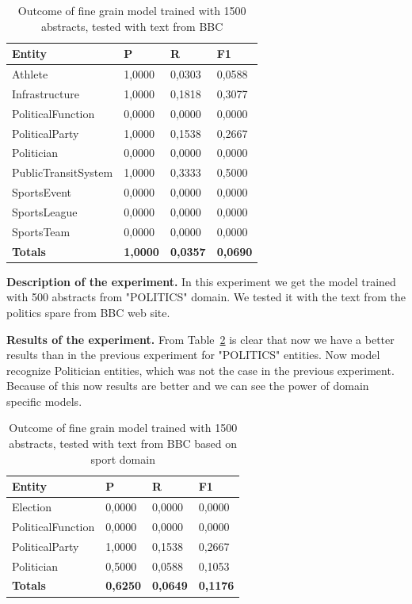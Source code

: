 \documentclass[thesis=M,english]{FITthesis}[2018/05/30]
\begin{document}
\begin{table}[H]\centering
	\begin{tabular}{|l|l|l|l|}
		\hline {\textbf{Entity}} & {\textbf{P}} & {\textbf{R}} & {\textbf{F1}}\\\hline
        Athlete & 1,0000 & 0,0303 & 0,0588\\
 		Infrastructure & 1,0000 & 0,1818 & 0,3077\\
		PoliticalFunction & 0,0000 & 0,0000&  0,0000\\  
 		PoliticalParty & 1,0000 & 0,1538 & 0,2667\\  
     	Politician & 0,0000 & 0,0000 & 0,0000\\
		PublicTransitSystem & 1,0000 & 0,3333 & 0,5000\\ 
    	SportsEvent & 0,0000 & 0,0000 & 0,0000\\
   		SportsLeague & 0,0000 & 0,0000 & 0,0000\\ 
    	SportsTeam & 0,0000 & 0,0000 & 0,0000\\\hline  
		\textbf{Totals} & \textbf{1,0000} & \textbf{0,0357} & \textbf{0,0690 }\\\hline
	\end{tabular}			
		\caption{Outcome of fine grain model trained with 1500 abstracts, tested with text from BBC\label{table:BBCWith1500Model}}
	\end{table}

\textbf{Description of the experiment.} In this experiment we get the model trained with 500 abstracts from "POLITICS" domain. We tested it with the text from the politics spare from BBC web site.

\textbf{Results of the experiment.} From Table~\ref{table:BBCPoliticsWith500SportModel} is clear that now we have a better results than in the previous experiment for "POLITICS" entities. Now model recognize Politician entities, which was not the case in the previous experiment. Because of this now results are better and we can see the power of domain specific models. 
	
	\begin{table}[H]\centering
	\begin{tabular}{|l|l|l|l|}
		\hline {\textbf{Entity}} & {\textbf{P}} & {\textbf{R}} & {\textbf{F1}}\\\hline
		Election & 0,0000 & 0,0000 & 0,0000\\
		PoliticalFunction & 0,0000 & 0,0000 &  0,0000\\  
 		PoliticalParty & 1,0000 & 0,1538 & 0,2667\\  
     	Politician & 0,5000 & 0,0588 & 0,1053\\
		\textbf{Totals} & \textbf{0,6250} & \textbf{0,0649} & \textbf{0,1176 }\\\hline
	\end{tabular}			
		\caption{Outcome of fine grain model trained with 1500 abstracts, tested with text from BBC based on sport domain\label{table:BBCPoliticsWith500SportModel}}
	\end{table}
	
\end{document}
